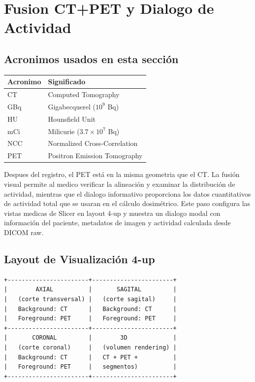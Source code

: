\documentclass[12pt,a4paper]{article}
\begin{document}
\section{Fusion CT+PET y Dialogo de Actividad}
\label{sec:fusion}

\subsection*{Acronimos usados en esta sección}
\begin{tabular}{ll}
\toprule
\textbf{Acronimo} & \textbf{Significado} \\
\midrule
CT & Computed Tomography \\
GBq & Gigabecquerel ($10^9$ Bq) \\
HU & Hounsfield Unit \\
mCi & Milicurie ($3.7 \times 10^7$ Bq) \\
NCC & Normalized Cross-Correlation \\
PET & Positron Emission Tomography \\
\bottomrule
\end{tabular}

Despues del registro, el PET está en la misma geometria que el CT. La fusión visual permite al
medico verificar la alineación y examinar la distribución de actividad, mientras que el dialogo
informativo proporciona los datos cuantitativos de actividad total que se usaran en el cálculo
dosimétrico. Este paso configura las vistas medicas de Slicer en layout 4-up y muestra un dialogo
modal con información del paciente, metadatos de imagen y actividad calculada desde DICOM raw.

\subsection{Layout de Visualización 4-up}

\begin{lstlisting}
+-----------------------+-----------------------+
|        AXIAL          |       SAGITAL         |
|   (corte transversal) |   (corte sagital)     |
|   Background: CT      |   Background: CT      |
|   Foreground: PET     |   Foreground: PET     |
+-----------------------+-----------------------+
|       CORONAL         |        3D             |
|   (corte coronal)     |   (volumen rendering) |
|   Background: CT      |   CT + PET +          |
|   Foreground: PET     |   segmentos)          |
+-----------------------+-----------------------+
\end{lstlisting}
\end{document}
